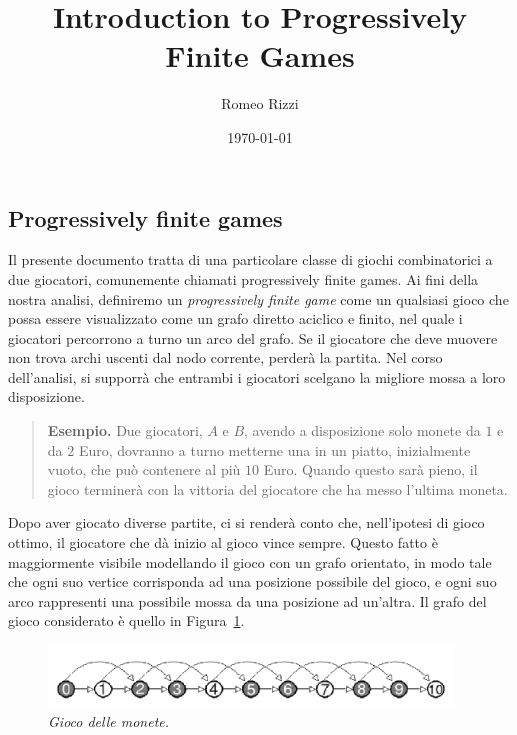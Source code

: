 \documentclass[a4paper, 10pt]{report}
\title{Introduction to Progressively Finite Games}
\author{Romeo Rizzi}
\date{\today}
\newenvironment{esempio}{\begin{quote}\textbf{Esempio.} }{\end{quote}}
\theoremstyle{definition} %
\begin{document}
\maketitle
\newpage
\begin{center}
\section*{Progressively finite games}
\end{center}


Il presente documento tratta di una particolare classe di giochi combinatorici
a due giocatori, comunemente chiamati progressively finite games. 
Ai fini della nostra analisi, definiremo un \emph{progressively finite game} come un
qualsiasi gioco che possa essere visualizzato come un grafo diretto aciclico e
finito, nel quale i giocatori percorrono a turno un arco del grafo. Se il
giocatore che deve muovere non trova archi uscenti dal nodo corrente, perder\`a
la partita. Nel corso dell'analisi, si supporr\`a che entrambi i giocatori
scelgano la migliore mossa a loro disposizione. 


\begin{esempio}
Due giocatori, $A$ e $B$, avendo a disposizione solo monete da $1$ e da $2$ Euro,
dovranno a turno metterne una in un piatto, inizialmente vuoto, che pu\`o
contenere al pi\`u $10$ Euro. Quando questo sar\`a pieno, il gioco terminer\`a
con la vittoria del giocatore che ha messo l'ultima moneta. 
\end{esempio}

Dopo aver giocato diverse partite, ci si render\`a conto che, nell'ipotesi di
gioco ottimo, il giocatore che d\`a inizio al gioco vince sempre. 
Questo fatto \`e maggiormente visibile  modellando il gioco con un grafo 
orientato, in modo tale che ogni suo vertice corrisponda ad una posizione 
possibile del gioco, e ogni suo arco rappresenti una possibile mossa 
da una posizione ad un'altra.
Il grafo del gioco considerato \`e quello in Figura~\ref{game_1_2coins}.

\begin{figure}[h]
  \label{game_1_2coins}
  \centerline{
    \includegraphics[width=0.96\textwidth]{figs/game_1_2coins.png}
  }
  \caption{\textsl{Gioco delle monete.}}
\end{figure}
\end{document}
